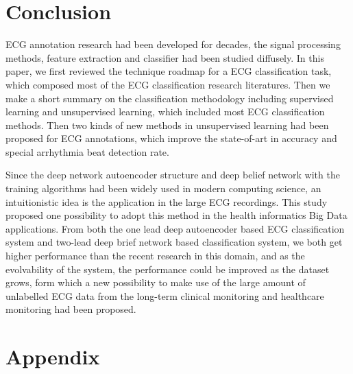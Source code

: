 \documentclass[graybox]{svmult}
\begin{document}
\section*{Conclusion}
ECG annotation research had been developed for decades, the signal processing methods, feature extraction and classifier had been studied diffusely. In this paper, we first reviewed the technique roadmap for a ECG classification task, which composed most of the ECG classification research literatures. Then we make a  short summary on the classification methodology including supervised learning and unsupervised learning, which included most ECG classification methods.  Then two kinds of new methods in unsupervised learning had been proposed for ECG annotations, which improve the state-of-art in accuracy and special arrhythmia beat detection rate.

Since the deep network autoencoder structure and deep belief network with the training algorithms had been widely used in modern computing science, an intuitionistic idea is the application in the large ECG recordings. This study proposed one possibility to adopt this method in the health informatics Big Data applications. From both the one lead deep autoencoder based ECG classification system and two-lead deep brief network based classification system, we both get higher performance than the recent research in this domain, and as the evolvability of the system, the performance could be improved as the dataset grows, form which a new possibility to make use of the large amount of unlabelled ECG data from the long-term clinical monitoring and healthcare monitoring had been proposed.






\section*{Appendix}
%
%



\end{document}
